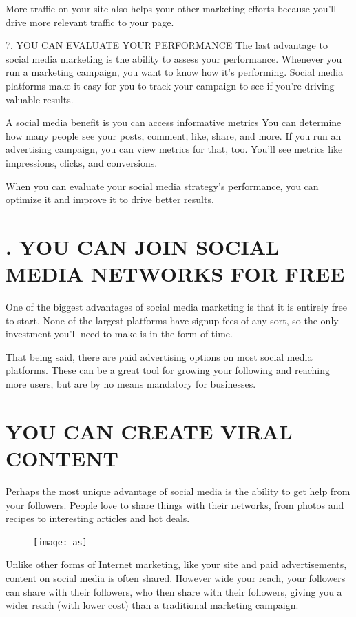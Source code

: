 \documentclass[a4paper]{article}
\begin{document}
More traffic on your site also helps your other marketing efforts because you’ll drive more relevant traffic to your page.

7. YOU CAN EVALUATE YOUR PERFORMANCE
The last advantage to social media marketing is the ability to assess your performance. Whenever you run a marketing campaign, you want to know how it’s performing. Social media platforms make it easy for you to track your campaign to see if you’re driving valuable results.

A social media benefit is you can access informative metrics
You can determine how many people see your posts, comment, like, share, and more. If you run an advertising campaign, you can view metrics for that, too. You’ll see metrics like impressions, clicks, and conversions.

When you can evaluate your social media strategy’s performance, you can optimize it and improve it to drive better results.
  
  \newpage
  
  \section{. YOU CAN JOIN SOCIAL MEDIA NETWORKS FOR FREE}
 One of the biggest advantages of social media marketing is that it is entirely free to start. None of the largest platforms have signup fees of any sort, so the only investment you’ll need to make is in the form of time.

That being said, there are paid advertising options on most social media platforms. These can be a great tool for growing your following and reaching more users, but are by no means mandatory for businesses.
  
 \section{ YOU CAN CREATE VIRAL CONTENT}
Perhaps the most unique advantage of social media is the ability to get help from your followers. People love to share things with their networks, from photos and recipes to interesting articles and hot deals.
\begin{figure}[h]
\centering
\texttt{[image: as]}
\end{figure}

Unlike other forms of Internet marketing, like your site and paid advertisements, content on social media is often shared. However wide your reach, your followers can share with their followers, who then share with their followers, giving you a wider reach (with lower cost) than a traditional marketing campaign.
  \newpage
\end{document}
